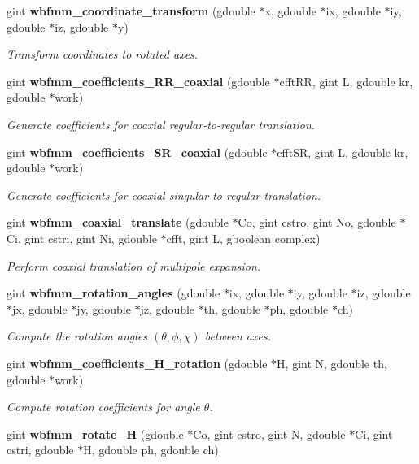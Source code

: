 \begin{DoxyCompactItemize}
gint {\bf wbfmm\+\_\+coordinate\+\_\+transform} (gdouble $\ast$x, gdouble $\ast$ix, gdouble $\ast$iy, gdouble $\ast$iz, gdouble $\ast$y)
\begin{DoxyCompactList}\small\item\em Transform coordinates to rotated axes. \end{DoxyCompactList}\item 
gint {\bf wbfmm\+\_\+coefficients\+\_\+\+R\+R\+\_\+coaxial} (gdouble $\ast$cfft\+R\+R, gint L, gdouble kr, gdouble $\ast$work)
\begin{DoxyCompactList}\small\item\em Generate coefficients for coaxial regular-\/to-\/regular translation. \end{DoxyCompactList}\item 
gint {\bf wbfmm\+\_\+coefficients\+\_\+\+S\+R\+\_\+coaxial} (gdouble $\ast$cfft\+S\+R, gint L, gdouble kr, gdouble $\ast$work)
\begin{DoxyCompactList}\small\item\em Generate coefficients for coaxial singular-\/to-\/regular translation. \end{DoxyCompactList}\item 
gint {\bf wbfmm\+\_\+coaxial\+\_\+translate} (gdouble $\ast$Co, gint cstro, gint No, gdouble $\ast$Ci, gint cstri, gint Ni, gdouble $\ast$cfft, gint L, gboolean complex)
\begin{DoxyCompactList}\small\item\em Perform coaxial translation of multipole expansion. \end{DoxyCompactList}\item 
gint {\bf wbfmm\+\_\+rotation\+\_\+angles} (gdouble $\ast$ix, gdouble $\ast$iy, gdouble $\ast$iz, gdouble $\ast$jx, gdouble $\ast$jy, gdouble $\ast$jz, gdouble $\ast$th, gdouble $\ast$ph, gdouble $\ast$ch)
\begin{DoxyCompactList}\small\item\em Compute the rotation angles $(\theta,\phi,\chi)$ between axes. \end{DoxyCompactList}\item 
gint {\bf wbfmm\+\_\+coefficients\+\_\+\+H\+\_\+rotation} (gdouble $\ast$H, gint N, gdouble th, gdouble $\ast$work)
\begin{DoxyCompactList}\small\item\em Compute rotation coefficients for angle $\theta$. \end{DoxyCompactList}\item 
gint {\bf wbfmm\+\_\+rotate\+\_\+\+H} (gdouble $\ast$Co, gint cstro, gint N, gdouble $\ast$Ci, gint cstri, gdouble $\ast$H, gdouble ph, gdouble ch)

\end{DoxyCompactItemize}
